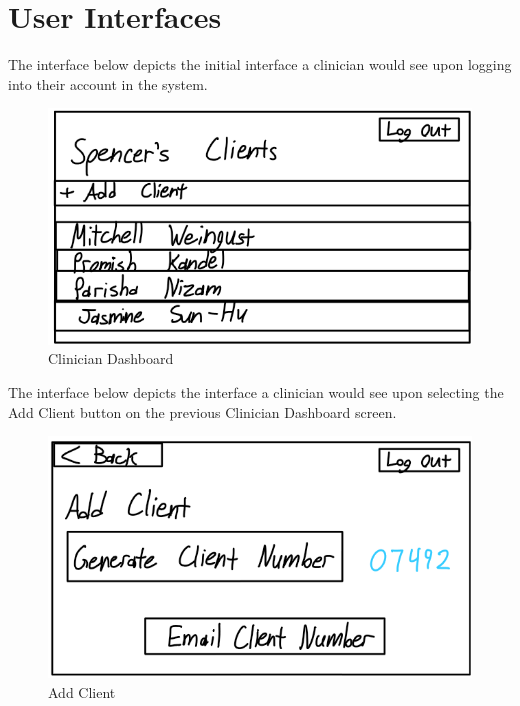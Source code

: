 \documentclass[12pt, titlepage]{article}
\begin{document}

\newpage

\section{User Interfaces}

\hspace{1.5em}The interface below depicts the initial interface a clinician would see upon logging into their account in the system.
\begin{figure}[H]
  \centering
  \includegraphics[scale=0.9]{images/Clinician-Dashboard.png}
  \caption{Clinician Dashboard}
\end{figure}

\hspace{1.5em}The interface below depicts the interface a clinician would see upon selecting the Add Client button on the previous Clinician Dashboard screen.
\begin{figure}[H]
  \centering
  \includegraphics[scale=0.9]{images/Add-Client.png}
  \caption{Add Client}
\end{figure}
\end{document}
